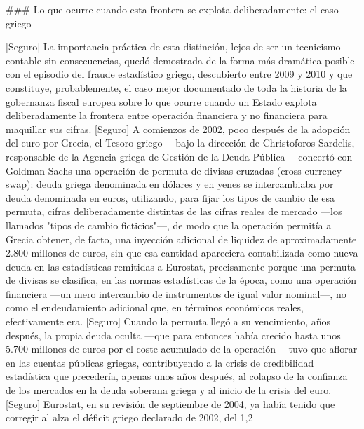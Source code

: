 \documentclass[10pt,a4paper]{article}
\begin{document}
### Lo que ocurre cuando esta frontera se explota deliberadamente: el caso griego

[Seguro] La importancia práctica de esta distinción, lejos de ser un tecnicismo contable sin consecuencias, quedó demostrada de la forma más dramática posible con el episodio del fraude estadístico griego, descubierto entre 2009 y 2010 y que constituye, probablemente, el caso mejor documentado de toda la historia de la gobernanza fiscal europea sobre lo que ocurre cuando un Estado explota deliberadamente la frontera entre operación financiera y no financiera para maquillar sus cifras. [Seguro] A comienzos de 2002, poco después de la adopción del euro por Grecia, el Tesoro griego —bajo la dirección de Christoforos Sardelis, responsable de la Agencia griega de Gestión de la Deuda Pública— concertó con Goldman Sachs una operación de permuta de divisas cruzadas (cross-currency swap): deuda griega denominada en dólares y en yenes se intercambiaba por deuda denominada en euros, utilizando, para fijar los tipos de cambio de esa permuta, cifras deliberadamente distintas de las cifras reales de mercado —los llamados "tipos de cambio ficticios"—, de modo que la operación permitía a Grecia obtener, de facto, una inyección adicional de liquidez de aproximadamente 2.800 millones de euros, sin que esa cantidad apareciera contabilizada como nueva deuda en las estadísticas remitidas a Eurostat, precisamente porque una permuta de divisas se clasifica, en las normas estadísticas de la época, como una operación financiera —un mero intercambio de instrumentos de igual valor nominal—, no como el endeudamiento adicional que, en términos económicos reales, efectivamente era. [Seguro] Cuando la permuta llegó a su vencimiento, años después, la propia deuda oculta —que para entonces había crecido hasta unos 5.700 millones de euros por el coste acumulado de la operación— tuvo que aflorar en las cuentas públicas griegas, contribuyendo a la crisis de credibilidad estadística que precedería, apenas unos años después, al colapso de la confianza de los mercados en la deuda soberana griega y al inicio de la crisis del euro. [Seguro] Eurostat, en su revisión de septiembre de 2004, ya había tenido que corregir al alza el déficit griego declarado de 2002, del 1,2%
\end{document}
